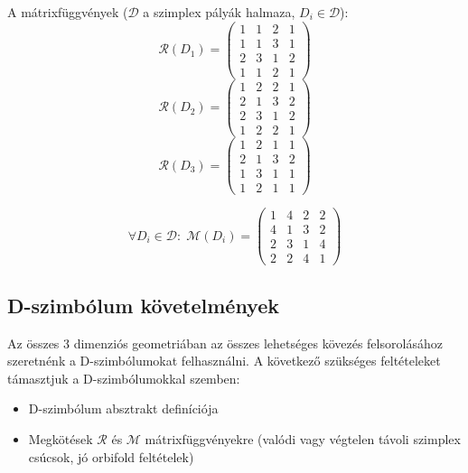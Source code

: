 \documentclass[12pt,magyar,a4paper]{article}
\begin{document}
A mátrixfüggvények ($\mathcal{D}$ a szimplex pályák halmaza,
$D_i\in\mathcal{D}$):
\begin{equation*}
  \mathcal{R}(D_1)=
  \left(
  \begin{array}{cccc}
    1 & 1 & 2 & 1\\
    1 & 1 & 3 & 1\\
    2 & 3 & 1 & 2\\
    1 & 1 & 2 & 1
  \end{array}
  \right)
\end{equation*}
\begin{equation*}
  \mathcal{R}(D_2)=
  \left(
  \begin{array}{cccc}
    1 & 2 & 2 & 1\\
    2 & 1 & 3 & 2\\
    2 & 3 & 1 & 2\\
    1 & 2 & 2 & 1
  \end{array}
  \right)
\end{equation*}
\begin{equation*}
  \mathcal{R}(D_3)=
  \left(
  \begin{array}{cccc}
    1 & 2 & 1 & 1\\
    2 & 1 & 3 & 2\\
    1 & 3 & 1 & 1\\
    1 & 2 & 1 & 1
  \end{array}
  \right)
\end{equation*}

\begin{equation*}
  \forall D_i\in\mathcal{D}:\;
  \mathcal{M}(D_i)=
  \left(
  \begin{array}{cccc}
    1 & 4 & 2 & 2\\
    4 & 1 & 3 & 2\\
    2 & 3 & 1 & 4\\
    2 & 2 & 4 & 1
  \end{array}
  \right)
\end{equation*}


\subsection{D-szimbólum követelmények}
\label{D-sym-cond}
Az összes 3 dimenziós geometriában az összes lehetséges kövezés felsorolásához
szeretnénk a D-szimbólumokat felhasználni. A következő szükséges feltételeket
támasztjuk a D-szimbólumokkal szemben:
\begin{itemize}
  \item D-szimbólum absztrakt definíciója
  \item Megkötések $\mathcal{R}$ és $\mathcal{M}$ mátrixfüggvényekre (valódi
    vagy végtelen távoli szimplex csúcsok, jó orbifold feltételek)
\end{itemize}
\end{document}
